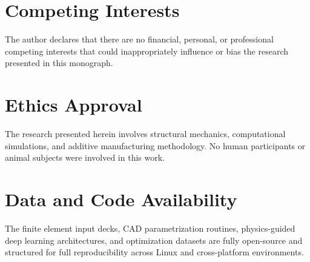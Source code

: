 
\section*{Competing Interests}
The author declares that there are no financial, personal, or professional competing interests that could inappropriately influence or bias the research presented in this monograph.

\section*{Ethics Approval}
The research presented herein involves structural mechanics, computational simulations, and additive manufacturing methodology. No human participants or animal subjects were involved in this work.

\section*{Data and Code Availability}
The finite element input decks, CAD parametrization routines, physics-guided deep learning architectures, and optimization datasets are fully open-source and structured for full reproducibility across Linux and cross-platform environments.
